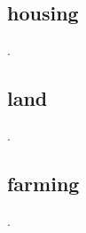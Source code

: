 \documentclass[a4paper,12pt,titlepage]{article}
\begin{document}
\newpage
\begin{centering}
	\section{housing}
\end{centering}
.

\newpage
\begin{centering}
	\section{land}
\end{centering}
.
\newpage
\begin{centering}
	\section{farming}
\end{centering}
.
\end{document}
